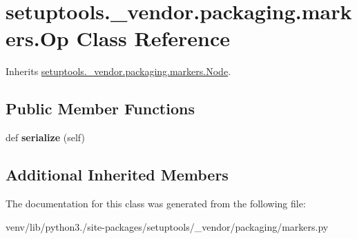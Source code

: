 \hypertarget{classsetuptools_1_1__vendor_1_1packaging_1_1markers_1_1_op}{}\section{setuptools.\+\_\+vendor.\+packaging.\+markers.\+Op Class Reference}
\label{classsetuptools_1_1__vendor_1_1packaging_1_1markers_1_1_op}


Inherits \hyperlink{classsetuptools_1_1__vendor_1_1packaging_1_1markers_1_1_node}{setuptools.\+\_\+vendor.\+packaging.\+markers.\+Node}.

\subsection*{Public Member Functions}
\begin{DoxyCompactItemize}
\item 
\mbox{\label{classsetuptools_1_1__vendor_1_1packaging_1_1markers_1_1_op_a2b9bf4d54dce3f2385f816aebb1bd263}} 
def {\bfseries serialize} (self)
\end{DoxyCompactItemize}
\subsection*{Additional Inherited Members}


The documentation for this class was generated from the following file\+:\begin{DoxyCompactItemize}
\item 
venv/lib/python3./site-\/packages/setuptools/\+\_\+vendor/packaging/markers.\+py\end{DoxyCompactItemize}
